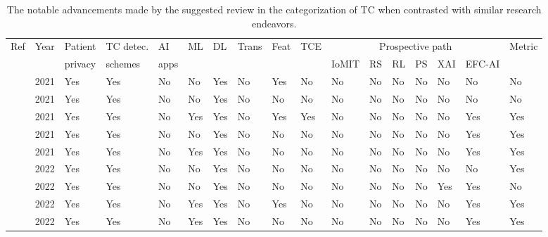 \documentclass[a4paper,fleqn]{cas-sc}
\begin{document}
\begin{table}[t!]
\caption{The notable advancements made by the suggested review in the categorization of TC when contrasted with similar research endeavors. }
\label{table:1}
\scriptsize
\begin{tabular}{
m{2mm}
m{3mm}
m{6mm}
m{11mm}
m{4mm}
m{4mm}
m{4mm}
m{4mm}
m{2mm}
m{4mm}
m{4mm}
m{4mm}
m{4mm}
m{4mm}
m{8mm}
m{8mm}
m{5mm}
}

\hline
Ref & Year & Patient& TC detec. & AI & ML & DL & Trans& Feat & TCE &  \multicolumn{6}{c}{Prospective path} & Metric \\

\cline{11-16}
 &  & privacy & schemes & apps &  &  & &  &  & IoMIT & RS & RL & PS &  XAI & EFC-AI  \\
\hline

\cite{liu2021deep} & 2021 & Yes & Yes & No & No & Yes & No & Yes & No & No & No & No & No & No & No & No   \\

\cite{iesato2021role} & 2021 & Yes & Yes & No & No & Yes & No& No & No & No & No & No  & No & No & No & No  \\

\cite{sharifi2021deep} & 2021 & Yes & Yes & No & Yes & Yes & No & Yes& Yes & No & No & No & No & No & Yes & Yes   \\

\cite{lin2021deep} & 2021 & Yes & Yes & No & No & Yes & No &No & No & No & No & No & No & No & Yes & Yes   \\

\cite{ha2021applications} & 2021 & Yes & Yes & No & Yes & Yes & No &No &No & No & No & No & No & No & Yes & Yes   \\

\cite{wu2022deep} & 2022 & Yes & Yes & No & No & Yes & No & No& No & No & No & No & No & No & No & Yes  \\

\cite{pavithra2022deep} & 2022 & Yes & Yes & No & No & Yes & No &No & No & No & No & No & No & Yes & Yes & No   \\

\cite{paul2022artificial} & 2022 & Yes & Yes & No & Yes & Yes & No & Yes& No & No & No & No & No & No & Yes & Yes   \\

\cite{ilyas2022deep} & 2022 & Yes & Yes & No & Yes & Yes & No & No & No & No & No & No & No & No & Yes & Yes   \\



\end{tabular}
\end{table}
\end{document}
